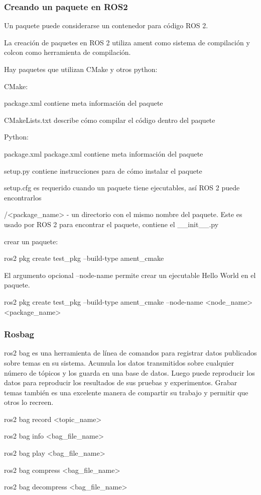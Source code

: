 \begin{frame}
	\frametitle{Creando un paquete en ROS2}
	
	Un paquete puede considerarse un contenedor para código ROS 2. 
	
	La creación de paquetes en ROS 2 utiliza ament como sistema de compilación y colcon como herramienta de compilación.
	
	Hay paquetes que utilizan CMake y otros python:
	
	CMake:
	
	package.xml contiene meta información del paquete
	
	CMakeLists.txt describe cómo compilar el código dentro del paquete
	
	Python:
	
	package.xml package.xml contiene meta información del paquete
	
	setup.py contiene instrucciones para de cómo instalar el paquete
	
	setup.cfg es requerido cuando un paquete tiene ejecutables, así ROS 2 puede encontrarlos
	
	/<package\_name> - un directorio con el mismo nombre del paquete. Este es usado por ROS 2 para encontrar el paquete, contiene el \_\_init\_\_.py
     
    crear un paquete:
     
     ros2 pkg create test\_pkg --build-type ament\_cmake
     
     El argumento opcional --node-name permite crear un ejecutable Hello World en el paquete.
     
     ros2 pkg create test\_pkg --build-type ament\_cmake --node-name <node\_name> <package\_name>
	
\end{frame}

\begin{frame}
	\frametitle{Rosbag}
	ros2 bag es una herramienta de línea de comandos para registrar datos publicados sobre temas en su sistema. Acumula los datos transmitidos sobre cualquier número de tópicos y los guarda en una base de datos. Luego puede reproducir los datos para reproducir los resultados de sus pruebas y experimentos. Grabar temas también es una excelente manera de compartir su trabajo y permitir que otros lo recreen.
	
	ros2 bag record <topic\_name>
	
	ros2 bag info <bag\_file\_name>
	
	ros2 bag play <bag\_file\_name>
	
	ros2 bag compress <bag\_file\_name>
	
	ros2 bag decompress <bag\_file\_name>
	
\end{frame}

